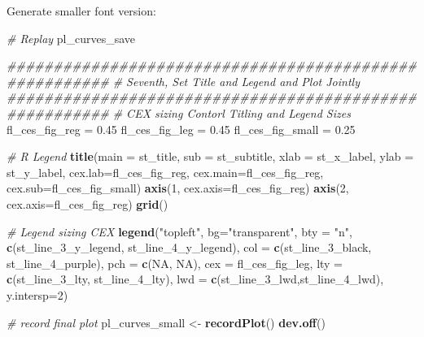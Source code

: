 \documentclass[
]{book}
\newenvironment{Shaded}{\begin{snugshade}}{\end{snugshade}}
\newcommand{\CommentTok}[1]{\textcolor[rgb]{0.56,0.35,0.01}{\textit{#1}}}
\newcommand{\DataTypeTok}[1]{\textcolor[rgb]{0.13,0.29,0.53}{#1}}
\newcommand{\DecValTok}[1]{\textcolor[rgb]{0.00,0.00,0.81}{#1}}
\newcommand{\FloatTok}[1]{\textcolor[rgb]{0.00,0.00,0.81}{#1}}
\newcommand{\KeywordTok}[1]{\textcolor[rgb]{0.13,0.29,0.53}{\textbf{#1}}}
\newcommand{\NormalTok}[1]{#1}
\newcommand{\OtherTok}[1]{\textcolor[rgb]{0.56,0.35,0.01}{#1}}
\newcommand{\StringTok}[1]{\textcolor[rgb]{0.31,0.60,0.02}{#1}}
\begin{document}
Generate smaller font version:

\begin{Shaded}
\begin{Highlighting}[]
\CommentTok{# Replay}
\NormalTok{pl_curves_save}

\CommentTok{#######################################################}
\CommentTok{# Seventh, Set Title and Legend and Plot Jointly}
\CommentTok{#######################################################}
\CommentTok{# CEX sizing Contorl Titling and Legend Sizes}
\NormalTok{fl_ces_fig_reg =}\StringTok{ }\FloatTok{0.45}
\NormalTok{fl_ces_fig_leg =}\StringTok{ }\FloatTok{0.45}
\NormalTok{fl_ces_fig_small =}\StringTok{ }\FloatTok{0.25}

\CommentTok{# R Legend}
\KeywordTok{title}\NormalTok{(}\DataTypeTok{main =}\NormalTok{ st_title, }\DataTypeTok{sub =}\NormalTok{ st_subtitle, }\DataTypeTok{xlab =}\NormalTok{ st_x_label, }\DataTypeTok{ylab =}\NormalTok{ st_y_label,}
      \DataTypeTok{cex.lab=}\NormalTok{fl_ces_fig_reg,}
      \DataTypeTok{cex.main=}\NormalTok{fl_ces_fig_reg,}
      \DataTypeTok{cex.sub=}\NormalTok{fl_ces_fig_small)}
\KeywordTok{axis}\NormalTok{(}\DecValTok{1}\NormalTok{, }\DataTypeTok{cex.axis=}\NormalTok{fl_ces_fig_reg)}
\KeywordTok{axis}\NormalTok{(}\DecValTok{2}\NormalTok{, }\DataTypeTok{cex.axis=}\NormalTok{fl_ces_fig_reg)}
\KeywordTok{grid}\NormalTok{()}

\CommentTok{# Legend sizing CEX}
\KeywordTok{legend}\NormalTok{(}\StringTok{"topleft"}\NormalTok{,}
       \DataTypeTok{bg=}\StringTok{"transparent"}\NormalTok{,}
       \DataTypeTok{bty =} \StringTok{"n"}\NormalTok{,}
       \KeywordTok{c}\NormalTok{(st_line_}\DecValTok{3}\NormalTok{_y_legend, st_line_}\DecValTok{4}\NormalTok{_y_legend),}
       \DataTypeTok{col =} \KeywordTok{c}\NormalTok{(st_line_}\DecValTok{3}\NormalTok{_black, st_line_}\DecValTok{4}\NormalTok{_purple),}
       \DataTypeTok{pch =} \KeywordTok{c}\NormalTok{(}\OtherTok{NA}\NormalTok{, }\OtherTok{NA}\NormalTok{),}
       \DataTypeTok{cex =}\NormalTok{ fl_ces_fig_leg,}
       \DataTypeTok{lty =} \KeywordTok{c}\NormalTok{(st_line_}\DecValTok{3}\NormalTok{_lty, st_line_}\DecValTok{4}\NormalTok{_lty),}
       \DataTypeTok{lwd =} \KeywordTok{c}\NormalTok{(st_line_}\DecValTok{3}\NormalTok{_lwd,st_line_}\DecValTok{4}\NormalTok{_lwd),}
       \DataTypeTok{y.intersp=}\DecValTok{2}\NormalTok{)}
\end{Highlighting}
\end{Shaded}

\begin{Shaded}
\begin{Highlighting}[]
\CommentTok{# record final plot}
\NormalTok{pl_curves_small <-}\StringTok{ }\KeywordTok{recordPlot}\NormalTok{()}
\KeywordTok{dev.off}\NormalTok{()}
\end{Highlighting}
\end{Shaded}
\end{document}
